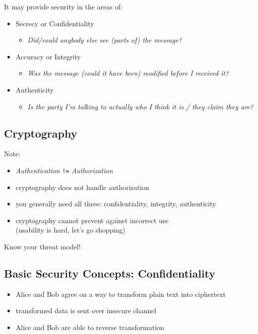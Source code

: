 \documentclass[xga]{xdvislides}
\begin{document}
It may provide security in the areas of:
\begin{itemize}
	\item Secrecy or Confidentiality
		\begin{itemize}
			\item {\em Did/could anybody else see (parts of) the message?}
		\end{itemize}
	\item Accuracy or Integrity
		\begin{itemize}
			\item {\em Was the message (could it have been) modified before I received it?}
		\end{itemize}
	\item Authenticity
		\begin{itemize}
			\item {\em Is the party I'm talking to actually
who I think it is / they claim they are?}
		\end{itemize}
\end{itemize}

\subsection{Cryptography}
Note:
\begin{itemize}
	\item {\em Authentication} \verb+!=+ {\em Authorization}
	\item cryptography does not handle authorization
	\item you generally need all three: confidentiality, integrity, authenticity
	\item cryptography cannot prevent against incorrect use \\
		(usability is hard, let's go shopping)
\end{itemize}
\addvspace{.5in}
Know your threat model!

\subsection{Basic Security Concepts: Confidentiality}
\begin{itemize}
	\item Alice and Bob agree on a way to transform plain text into ciphertext
	\item transformed data is sent over insecure channel
	\item Alice and Bob are able to reverse transformation
\end{itemize}
\end{document}
